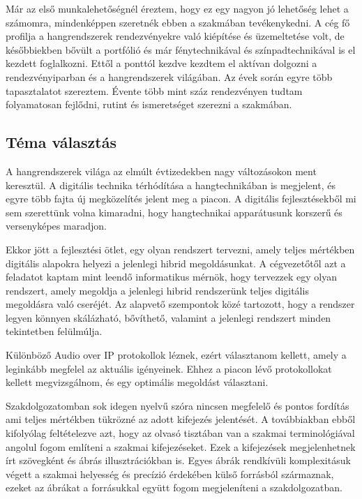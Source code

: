 Már az első munkalehetőségnél éreztem, hogy ez egy nagyon jó lehetőség lehet a számomra, mindenképpen szeretnék ebben a szakmában tevékenykedni.
A cég fő profilja a hangrendszerek rendezvényekre való kiépítése és üzemeltetése volt, de későbbiekben bővült a portfólió és már fénytechnikával és színpadtechnikával is el kezdett foglalkozni. 
Ettől a ponttól kezdve kezdtem el aktívan dolgozni a rendezvényiparban és a hangrendszerek világában. Az évek során egyre több tapasztalatot
szereztem. Évente több mint száz rendezvényen tudtam folyamatosan fejlődni, rutint és ismeretséget szerezni a szakmában.

\subsection{Téma választás}

A hangrendszerek világa az elmúlt évtizedekben nagy változásokon ment keresztül. A digitális technika térhódítása a hangtechnikában is megjelent, és egyre több fajta új megközelítés jelent meg a piacon.
A digitális fejlesztésekből mi sem szerettünk volna kimaradni, hogy hangtechnikai apparátusunk korszerű és versenyképes maradjon.

Ekkor jött a fejlesztési ötlet, egy olyan rendszert tervezni, amely teljes mértékben digitális alapokra helyezi a jelenlegi hibrid megoldásunkat. A cégvezetőtől azt a feladatot kaptam mint leendő informatikus mérnök,
hogy tervezzek egy olyan rendszert, amely megoldja a jelenlegi hibrid rendszerünk teljes digitális megoldásra való cseréjét. 
Az alapvető szempontok közé tartozott, hogy a rendszer legyen könnyen skálázható, bővíthető, valamint a jelenlegi rendszert minden tekintetben felülmúlja.

Különböző Audio over IP protokollok léznek, ezért választanom kellett, amely a leginkább megfelel az aktuális igényeinek.
Ehhez a piacon lévő protokollokat kellett megvizsgálnom, és egy optimális megoldást választani. 

Szakdolgozatomban sok idegen nyelvű szóra nincsen megfelelő és pontos fordítás ami teljes mértékben tükrözné az adott kifejezés jelentését.
A továbbiakban ebből kifolyólag feltételezve azt, hogy az olvasó tisztában van a szakmai terminológiával angolul fogom említeni a szakmai kifejezéseket.
Ezek a kifejezések megjelenhetnek írt szövegként és ábrás illusztrációkban is. Egyes ábrák rendkívüli komplexitásuk végett a szakmai helyesség és precízió érdekében
külső forrásból származnak, ezeket az ábrákat a forrásukkal együtt fogom megjeleníteni a szakdolgozatban.
